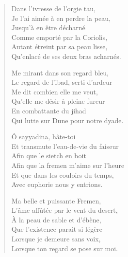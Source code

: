 \begin{verse}%
  \sizain%
  Dans l’ivresse de l’orgie tau,\\  %
  Je l’ai aimée à en perdre la peau,\\  %
  Jusqu’à en être décharné\\  %
  Comme emporté par la Coriolis,\\  %
  Autant étreint par sa peau lisse,\\  %
  Qu’enlacé de ses deux bras acharnés.

  Me mirant dans son regard bleu,\\  %
  Le regard de l’ibad, serti d’ardeur\\  %
  Me dit combien elle me veut,\\  %
  Qu’elle me désir à pleine fureur\\  %
  En combattante du jihad\\  %
  Qui lutte sur Dune pour notre dyade.

  Ô sayyadina, hâte-toi\\  %
  Et transmute l’eau-de-vie du faiseur\\  %
  Afin que le sietch en boit\\  %
  Afin que la fremen m’aime sur l’heure\\  %
  Et que dans les couloirs du temps,\\  %
  Avec euphorie nous y entrions.

  Ma belle et puissante Fremen,\\  %
  L’âme affûtée par le vent du desert,\\  %
  À la peau de sable et d’ébène,\\  %
  Que l’existence parait si légère\\  %
  Lorsque je demeure sans voix,\\  %
  Lorsque ton regard se pose sur moi.


\end{verse}
